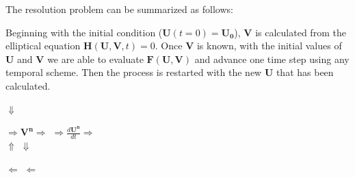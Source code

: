 The resolution problem can be summarized as follows: 

Beginning with the initial condition ($\mathbf{U} (t=0)= \mathbf{U_0}$),
$\mathbf{V}$ is calculated from the elliptical equation
$\mathbf{H}(\mathbf{U},\mathbf{V}, t)=0 $. Once $\mathbf{V}$ is known, with the
initial values of $\mathbf{U}$ and $\mathbf{V}$ we are able to evaluate
$\mathbf{F}(\mathbf{U},\mathbf{V})$ and advance one time step using any temporal
scheme. Then the process is restarted with the new $\mathbf{U}$ that has been
calculated. \\

\begin{framed}


\hspace{1.5 cm}$\Downarrow$

 $\Rightarrow \mathbf{V^n} \Rightarrow $
 $\Rightarrow \frac{d \mathbf{U^n}}{dt} \Rightarrow $
 \\
 
  \hspace{1.5 cm}$\Uparrow$ \hspace{10.5cm} $\Downarrow$
 
  \hspace{0.5cm} $\Leftarrow$
\hspace{0.5cm} 
\hspace{0.5cm} $\Leftarrow$ \hspace{0.5cm}

\end{framed}

